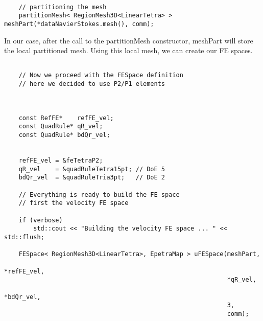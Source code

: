 \begin{verbatim}

    // partitioning the mesh
    partitionMesh< RegionMesh3D<LinearTetra> >   meshPart(*dataNavierStokes.mesh(), comm);

\end{verbatim}

In our case, after the call to the partitionMesh constructor, meshPart will store
the local partitioned mesh. Using this local mesh, we can create our FE spaces.

\begin{verbatim}

    // Now we proceed with the FESpace definition
    // here we decided to use P2/P1 elements



    const RefFE*    refFE_vel;
    const QuadRule* qR_vel;
    const QuadRule* bdQr_vel;


    refFE_vel = &feTetraP2;
    qR_vel    = &quadRuleTetra15pt; // DoE 5
    bdQr_vel  = &quadRuleTria3pt;   // DoE 2

    // Everything is ready to build the FE space
    // first the velocity FE space

    if (verbose)
        std::cout << "Building the velocity FE space ... " << std::flush;

    FESpace< RegionMesh3D<LinearTetra>, EpetraMap > uFESpace(meshPart,
                                                             *refFE_vel,
                                                             *qR_vel,
                                                             *bdQr_vel,
                                                             3,
                                                             comm);

\end{verbatim}

